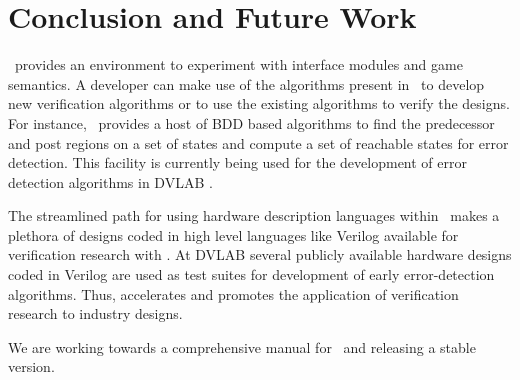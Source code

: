 \chapter{Conclusion and Future Work}
\chai \ provides an environment to experiment with interface
modules and game semantics. A developer can make use of the algorithms
present in \chai \ to develop new verification algorithms or to use
the existing algorithms to verify the designs. For instance,
\chai\ provides a host of BDD based algorithms to find the
predecessor and post regions on a set of states and compute a set
of reachable states for error detection. This facility is
currently being used for the development of error detection algorithms
in DVLAB \cite{dvlab}.

The streamlined path for using hardware description languages
within \chai\ makes a plethora of designs coded in high level
languages like Verilog available for verification research with
{\chai}. At DVLAB \cite{dvlab} several publicly available hardware
designs coded in Verilog are used as test suites for development
of early error-detection algorithms. Thus, {\chai} accelerates and
promotes the application of verification research to 
industry designs.

We are working towards a comprehensive manual for \chai\ and
releasing a stable version. 



